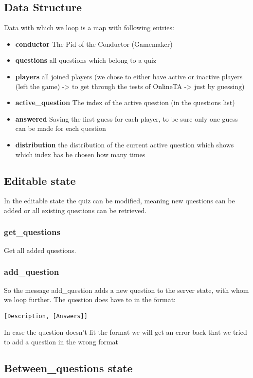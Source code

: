 \documentclass[12pt,a4paper]{article}
\begin{document}
\subsection{Data Structure}
Data with which we loop is a map with following entries:
\begin{itemize}
	\item \textbf{conductor} The Pid of the Conductor (Gamemaker)
	\item \textbf{questions} all questions which belong to a quiz
	\item \textbf{players} all joined players (we chose to either have active or inactive players (left the game) -> to get through the tests of OnlineTA -> just by guessing)
	\item \textbf{active\_question} The index of the active question (in the questions list)
	\item \textbf{answered} Saving the first guess for each player, to be sure only one guess can be made for each question
	\item \textbf{distribution} the distribution of the current active question which shows which index has be chosen how many times
\end{itemize}

\subsection{Editable state}
In the editable state the quiz can be modified, meaning new questions can be added or all existing questions can be retrieved.

\subsubsection{get\_questions}
Get all added questions.

\subsubsection{add\_question}
So the message add\_question adds a new question to the server state, with whom we loop further.
The question does have to in the format:
\begin{verbatim}
[Description, [Answers]]
\end{verbatim}

In case the question doesn't fit the format we will get an error back that we tried to add a question in the wrong format


\subsection{Between\_questions state}
\end{document}
